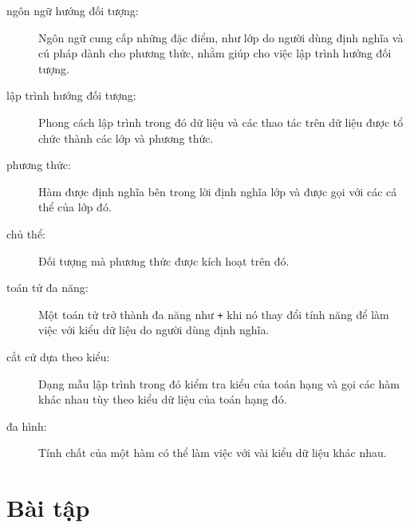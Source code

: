 \documentclass[11pt]{book}
\begin{document}
\begin{description}

\item[ngôn ngữ hướng đối tượng:] Ngôn ngữ cung cấp những đặc điểm,
  như lớp do người dùng định nghĩa và cú pháp dành cho phương thức,
  nhằm giúp cho việc lập trình hướng đối tượng.

\item[lập trình hướng đối tượng:] Phong cách lập trình trong đó
dữ liệu và các thao tác trên dữ liệu được tổ chức thành các lớp và
phương thức.

\item[phương thức:] Hàm được định nghĩa bên trong lời định nghĩa lớp
và được gọi với các cá thể của lớp đó.

\item[chủ thể:] Đối tượng mà phương thức được kích hoạt trên đó.

\item[toán tử đa năng:] Một toán tử trở thành đa năng như 
{\tt +} khi nó thay đổi tính năng để làm việc với kiểu dữ liệu do người dùng
định nghĩa.

\item[cắt cử dựa theo kiểu:] Dạng mẫu lập trình trong đó kiểm tra kiểu của
toán hạng và gọi các hàm khác nhau tùy theo kiểu dữ liệu của toán hạng đó.

\item[đa hình:] Tính chất của một hàm có thể làm việc với vài kiểu dữ liệu khác nhau.


\end{description}

\section{Bài tập}
\end{document}
